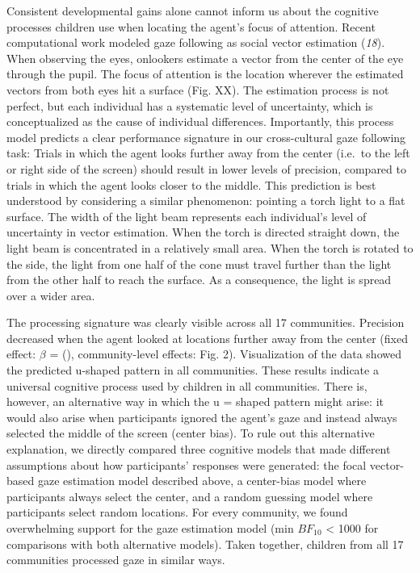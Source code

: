 \documentclass[
  man,floatsintext]{apa6}
\begin{document}
Consistent developmental gains alone cannot inform us about the cognitive processes children use when locating the agent's focus of attention. Recent computational work modeled gaze following as social vector estimation (\emph{18}). When observing the eyes, onlookers estimate a vector from the center of the eye through the pupil. The focus of attention is the location wherever the estimated vectors from both eyes hit a surface (Fig. XX). The estimation process is not perfect, but each individual has a systematic level of uncertainty, which is conceptualized as the cause of individual differences. Importantly, this process model predicts a clear performance signature in our cross-cultural gaze following task: Trials in which the agent looks further away from the center (i.e.~to the left or right side of the screen) should result in lower levels of precision, compared to trials in which the agent looks closer to the middle. This prediction is best understood by considering a similar phenomenon: pointing a torch light to a flat surface. The width of the light beam represents each individual's level of uncertainty in vector estimation. When the torch is directed straight down, the light beam is concentrated in a relatively small area. When the torch is rotated to the side, the light from one half of the cone must travel further than the light from the other half to reach the surface. As a consequence, the light is spread over a wider area.

The processing signature was clearly visible across all 17 communities. Precision decreased when the agent looked at locations further away from the center (fixed effect: \(\beta\) = (), community-level effects: Fig. 2). Visualization of the data showed the predicted u-shaped pattern in all communities. These results indicate a universal cognitive process used by children in all communities. There is, however, an alternative way in which the u = shaped pattern might arise: it would also arise when participants ignored the agent's gaze and instead always selected the middle of the screen (center bias). To rule out this alternative explanation, we directly compared three cognitive models that made different assumptions about how participants' responses were generated: the focal vector-based gaze estimation model described above, a center-bias model where participants always select the center, and a random guessing model where participants select random locations. For every community, we found overwhelming support for the gaze estimation model (min \(BF_{10}\) \textless{} 1000 for comparisons with both alternative models). Taken together, children from all 17 communities processed gaze in similar ways.
\end{document}
